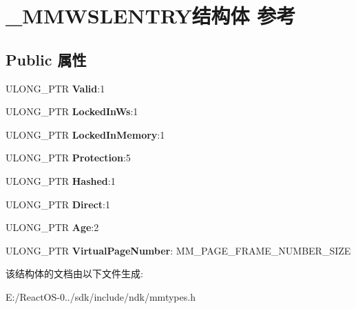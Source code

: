 \hypertarget{struct___m_m_w_s_l_e_n_t_r_y}{}\section{\+\_\+\+M\+M\+W\+S\+L\+E\+N\+T\+R\+Y结构体 参考}
\label{struct___m_m_w_s_l_e_n_t_r_y}
\subsection*{Public 属性}
\begin{DoxyCompactItemize}
\item 
\mbox{\label{struct___m_m_w_s_l_e_n_t_r_y_a1165b0e21d44a876ae7ea2bd755b96bc}} 
U\+L\+O\+N\+G\+\_\+\+P\+TR {\bfseries Valid}\+:1
\item 
\mbox{\label{struct___m_m_w_s_l_e_n_t_r_y_abebea81d01865c27100fd66d45534113}} 
U\+L\+O\+N\+G\+\_\+\+P\+TR {\bfseries Locked\+In\+Ws}\+:1
\item 
\mbox{\label{struct___m_m_w_s_l_e_n_t_r_y_a43d0a9326a297d3be9d0ae2256597974}} 
U\+L\+O\+N\+G\+\_\+\+P\+TR {\bfseries Locked\+In\+Memory}\+:1
\item 
\mbox{\label{struct___m_m_w_s_l_e_n_t_r_y_a21e3437f4b88b685bda3ea2d997c6411}} 
U\+L\+O\+N\+G\+\_\+\+P\+TR {\bfseries Protection}\+:5
\item 
\mbox{\label{struct___m_m_w_s_l_e_n_t_r_y_a766b4c484ebd16e1e1886fca2cd00021}} 
U\+L\+O\+N\+G\+\_\+\+P\+TR {\bfseries Hashed}\+:1
\item 
\mbox{\label{struct___m_m_w_s_l_e_n_t_r_y_a1845c4b77bc47233b20561bea91c6d86}} 
U\+L\+O\+N\+G\+\_\+\+P\+TR {\bfseries Direct}\+:1
\item 
\mbox{\label{struct___m_m_w_s_l_e_n_t_r_y_ac2eb4934794efd37b4ba67f482d5a8aa}} 
U\+L\+O\+N\+G\+\_\+\+P\+TR {\bfseries Age}\+:2
\item 
\mbox{\label{struct___m_m_w_s_l_e_n_t_r_y_ab942c2fc7f955697c8204356cb9127c6}} 
U\+L\+O\+N\+G\+\_\+\+P\+TR {\bfseries Virtual\+Page\+Number}\+: M\+M\+\_\+\+P\+A\+G\+E\+\_\+\+F\+R\+A\+M\+E\+\_\+\+N\+U\+M\+B\+E\+R\+\_\+\+S\+I\+ZE
\end{DoxyCompactItemize}


该结构体的文档由以下文件生成\+:\begin{DoxyCompactItemize}
\item 
E\+:/\+React\+O\+S-\/0../sdk/include/ndk/mmtypes.\+h\end{DoxyCompactItemize}
